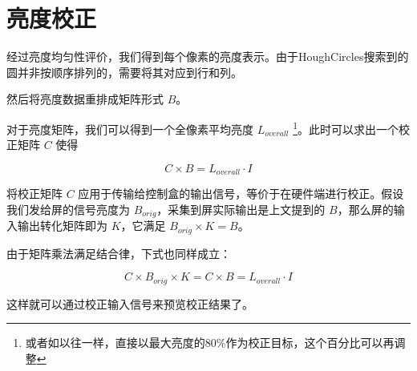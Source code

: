 
\section{亮度校正} %
\label{sec:correction}

经过亮度均匀性评价，我们得到每个像素的亮度表示。由于HoughCircles搜索到的圆并非按顺序排列的，需要将其对应到行和列。

然后将亮度数据重排成矩阵形式 $B$。

对于亮度矩阵，我们可以得到一个全像素平均亮度 $L_{overall}$ \footnote{或者如以往一样，直接以最大亮度的80\%作为校正目标，这个百分比可以再调整}。此时可以求出一个校正矩阵 $C$ 使得

\begin{equation}
    C \times B = L_{overall} \cdot I
\end{equation}

将校正矩阵 $C$ 应用于传输给控制盒的输出信号，等价于在硬件端进行校正。假设我们发给屏的信号亮度为 $B_{orig}$，采集到屏实际输出是上文提到的 $B$，那么屏的输入输出转化矩阵即为 $K$，它满足 $B_{orig} \times K = B$。

由于矩阵乘法满足结合律，下式也同样成立：

\begin{equation}
    C \times B_{orig} \times K = C \times B = L_{overall} \cdot I
\end{equation}

这样就可以通过校正输入信号来预览校正结果了。

